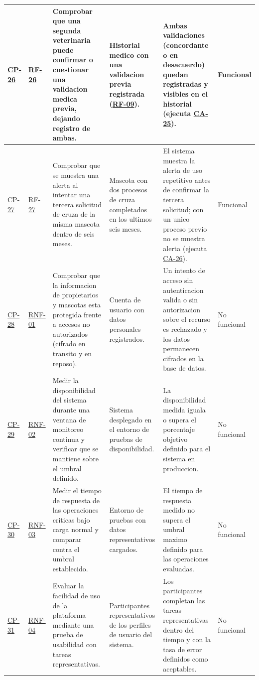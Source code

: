 \documentclass[journal,onecolumn]{IEEEtran}
\begin{document}
\begin{landscape}
\begin{longtable}{@{}p{1.3cm} p{1.3cm} p{4.6cm} p{3.6cm} p{5.2cm} p{1.6cm}@{}}
			\hyperref[cp:26]{CP-26}\label{cp:26} & \hyperref[tab:RF-26]{RF-26} & Comprobar que una segunda veterinaria puede confirmar o cuestionar una validacion medica previa, dejando registro de ambas. & Historial medico con una validacion previa registrada (\hyperref[tab:RF-09]{RF-09}). & Ambas validaciones (concordante o en desacuerdo) quedan registradas y visibles en el historial (ejecuta \hyperref[lst:ca25]{CA-25}). & Funcional \\ \midrule
			\hyperref[cp:27]{CP-27}\label{cp:27} & \hyperref[tab:RF-27]{RF-27} & Comprobar que se muestra una alerta al intentar una tercera solicitud de cruza de la misma mascota dentro de seis meses. & Mascota con dos procesos de cruza completados en los ultimos seis meses. & El sistema muestra la alerta de uso repetitivo antes de confirmar la tercera solicitud; con un unico proceso previo no se muestra alerta (ejecuta \hyperref[lst:ca26]{CA-26}). & Funcional \\ \midrule
			\hyperref[cp:28]{CP-28}\label{cp:28} & \hyperref[tab:RNF-01]{RNF-01} & Comprobar que la informacion de propietarios y mascotas esta protegida frente a accesos no autorizados (cifrado en transito y en reposo). & Cuenta de usuario con datos personales registrados. & Un intento de acceso sin autenticacion valida o sin autorizacion sobre el recurso es rechazado y los datos permanecen cifrados en la base de datos. & No funcional \\ \midrule
			\hyperref[cp:29]{CP-29}\label{cp:29} & \hyperref[tab:RNF-02]{RNF-02} & Medir la disponibilidad del sistema durante una ventana de monitoreo continua y verificar que se mantiene sobre el umbral definido. & Sistema desplegado en el entorno de pruebas de disponibilidad. & La disponibilidad medida iguala o supera el porcentaje objetivo definido para el sistema en produccion. & No funcional \\ \midrule
			\hyperref[cp:30]{CP-30}\label{cp:30} & \hyperref[tab:RNF-03]{RNF-03} & Medir el tiempo de respuesta de las operaciones criticas bajo carga normal y comparar contra el umbral establecido. & Entorno de pruebas con datos representativos cargados. & El tiempo de respuesta medido no supera el umbral maximo definido para las operaciones evaluadas. & No funcional \\ \midrule
			\hyperref[cp:31]{CP-31}\label{cp:31} & \hyperref[tab:RNF-04]{RNF-04} & Evaluar la facilidad de uso de la plataforma mediante una prueba de usabilidad con tareas representativas. & Participantes representativos de los perfiles de usuario del sistema. & Los participantes completan las tareas representativas dentro del tiempo y con la tasa de error definidos como aceptables. & No funcional \\ \midrule

\end{longtable}
\end{landscape}
\end{document}
